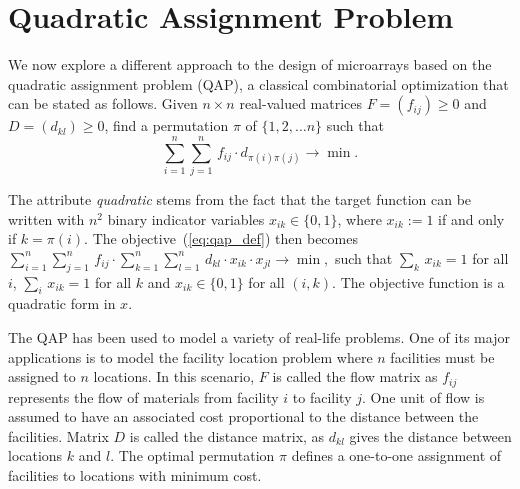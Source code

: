\documentclass[english]{lni}
\begin{document}
\section{Quadratic Assignment Problem}
\label{sec:qap}

We now explore a different approach to the design of microarrays based on the
quadratic assignment problem (QAP), a classical combinatorial optimization
that can be stated as follows. Given $n \times n$ real-valued matrices $F =
(f_{ij})\geq 0$ and $D = (d_{kl})\geq 0$, find a permutation $\pi$ of $\{1, 2,
\ldots n\}$ such that
\begin{equation}\label{eq:qap_def}
  \sum_{i=1}^{n} \sum_{j=1}^{n}\,  f_{ij} \cdot d_{\pi(i)\pi(j)} \to \min.
\end{equation}

The attribute \emph{quadratic} stems from the fact that the target function
can be written with $n^2$ binary indicator variables $x_{ik}\in\{0,1\}$, where
$x_{ik}:=1$ if and only if $k=\pi(i)$. The objective~(\ref{eq:qap_def}) then
becomes
$
  \sum_{i=1}^{n} \sum_{j=1}^{n}\,  f_{ij} \cdot 
  \sum_{k=1}^{n} \sum_{l=1}^{n}\,  d_{kl} \cdot x_{ik}\cdot x_{jl}
  \to \min,
$
such that $\sum_{k}\, x_{ik}=1$ for all $i$, $\sum_{i}\, x_{ik}=1$ for all $k$
and $x_{ik}\in\{0,1\}$ for all $(i,k)$. The objective function is a quadratic
form in $x$.

The QAP has been used to model a variety of real-life problems. One of its
major applications is to model the facility location problem where $n$
facilities must be assigned to $n$ locations. In this scenario, $F$ is called
the flow matrix as $f_{ij}$ represents the flow of materials from facility $i$
to facility $j$. One unit of flow is assumed to have an associated cost
proportional to the distance between the facilities. Matrix $D$ is called the
distance matrix, as $d_{kl}$ gives the distance between locations $k$ and $l$.
The optimal permutation $\pi$ defines a one-to-one assignment of facilities to
locations with minimum cost.
\end{document}
